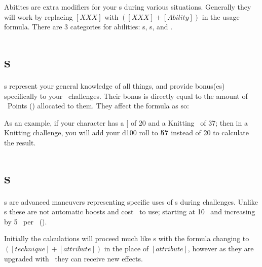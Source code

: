 Abitites are extra modifiers for your \attribute s during various situations. Generally they will work by replacing $[XXX]$ with $([XXX]+[Ability])$ in the usage formula. There are 3 categories for abilities: \skill s, \techn s, and \AWEAWF.

\section{\skill s}\label{sec:skills}

\skill s represent your general knowledge of all things, and provide bonus(es) specifically to your \KNOW\ challenges. Their bonus is directly equal to the amount of \skill\ Points (\skillval) allocated to them. They affect the formula as so:


As an example, if your character has a {[}\KNOW{]} of 20 and a Knitting \skill\ of 37; then in a Knitting challenge, you will add your d100 roll to \textbf{57} instead of 20 to calculate the result.


\section{\techn s\index{\techn}}\label{sec:techniques}

\techn s are advanced maneuvers representing specific uses of \attribute s during challenges. Unlike \skill s these are not automatic boosts and cost \ENful\ to use; starting at 10 \EN\ and increasing by 5 \EN\ per \advancement\ (\advanmini). 

Initially the calculations will proceed much like \skill s with the formula changing to $([technique]+[attribute])$ in the place of $[attribute]$, however as they are upgraded with \advanmini\ they can receive new effects.


\section{\AWEAWF{}}\label{sec:aweawf}

